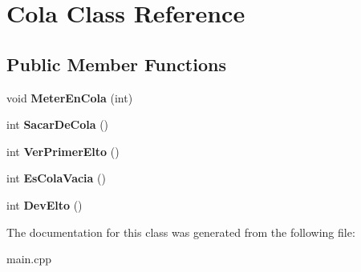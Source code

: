 \hypertarget{class_cola}{
\section{\-Cola \-Class \-Reference}
\label{class_cola}
}
\subsection*{\-Public \-Member \-Functions}
\begin{DoxyCompactItemize}
\item 
\hypertarget{class_cola_ae76d94a5e57798ffe5a07781673b9f15}{
void {\bfseries \-Meter\-En\-Cola} (int)}
\label{class_cola_ae76d94a5e57798ffe5a07781673b9f15}

\item 
\hypertarget{class_cola_a14ef6476d40ce344feaa1de354f0871b}{
int {\bfseries \-Sacar\-De\-Cola} ()}
\label{class_cola_a14ef6476d40ce344feaa1de354f0871b}

\item 
\hypertarget{class_cola_a3c059d1c059eb7e0050b74f4727c0b48}{
int {\bfseries \-Ver\-Primer\-Elto} ()}
\label{class_cola_a3c059d1c059eb7e0050b74f4727c0b48}

\item 
\hypertarget{class_cola_aa11f9c3ee84981f1cab6972de44f99d3}{
int {\bfseries \-Es\-Cola\-Vacia} ()}
\label{class_cola_aa11f9c3ee84981f1cab6972de44f99d3}

\item 
\hypertarget{class_cola_a0e794712db2d5ce83e71b709d4bd9c91}{
int {\bfseries \-Dev\-Elto} ()}
\label{class_cola_a0e794712db2d5ce83e71b709d4bd9c91}

\end{DoxyCompactItemize}


\-The documentation for this class was generated from the following file\-:\begin{DoxyCompactItemize}
\item 
main.\-cpp\end{DoxyCompactItemize}
